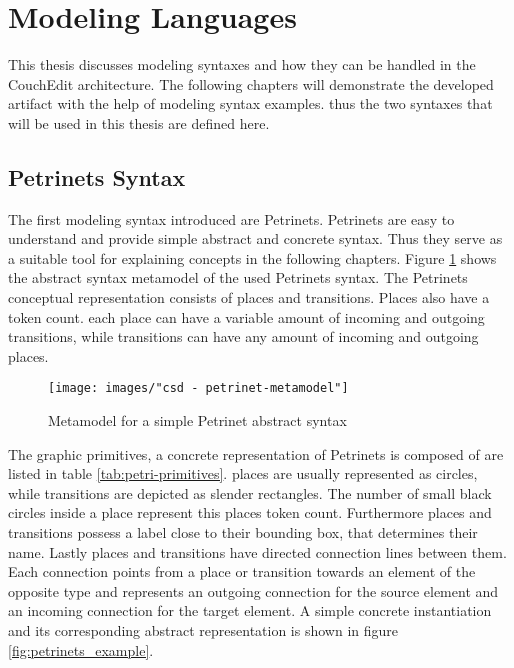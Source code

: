 \section{Modeling Languages}
This thesis discusses modeling syntaxes and how they can be handled in the CouchEdit architecture. The following chapters will demonstrate the developed artifact with the help of modeling syntax examples. thus the two syntaxes that will be used in this thesis are defined here.

\subsection{Petrinets Syntax}
\label{sec:petrinets}
The first modeling syntax introduced are Petrinets. Petrinets are easy to understand and provide simple abstract and concrete syntax. Thus they serve as a suitable tool for explaining concepts in the following chapters. Figure \ref{fig:petrinets_metamodel} shows the abstract syntax metamodel of the used Petrinets syntax. The Petrinets conceptual representation consists of places and transitions. Places also have a token count. each place can have a variable amount of incoming and outgoing transitions, while transitions can have any amount of incoming and outgoing places. 

\begin{figure}[H]
  \centering
  \texttt{[image: images/"csd - petrinet-metamodel"]}
  \caption{Metamodel for a simple Petrinet abstract syntax}
  \label{fig:petrinets_metamodel}
\end{figure}

The graphic primitives, a concrete representation of Petrinets is composed of are listed in table \ref{tab:petri-primitives}. places are usually represented as circles, while transitions are depicted as slender rectangles. The number of small black circles inside a place represent this places token count. Furthermore places and transitions possess a label close to their bounding box, that determines their name. Lastly places and transitions have directed connection lines between them. Each connection points from a place or transition towards an element of the opposite type and represents an outgoing connection for the source element and an incoming connection for the target element. A simple concrete instantiation and its corresponding abstract representation is shown in figure \ref{fig:petrinets_example}.

